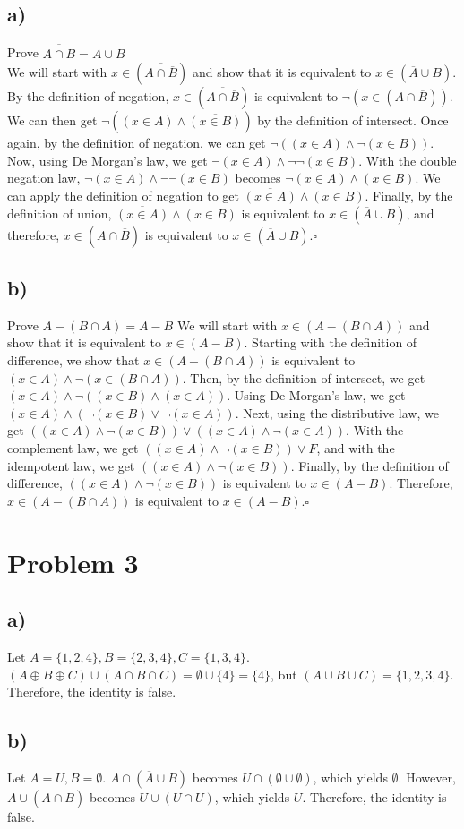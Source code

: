 \documentclass{article}
\begin{document}
\subsection*{a)}
Prove $\overline{A\cap \overline{B}}=\overline{A}\cup B$\\
We will start with $x\in(\overline{A\cap \overline{B}})$ and show that it is equivalent to $x\in(\overline{A}\cup B)$. By the definition of negation, $x\in(\overline{A\cap \overline{B}})$ is equivalent to $\neg(x\in(A\cap \overline{B}))$. We can then get $\neg((x\in A)\land \overline{(x\in B)})$ by the definition of intersect. Once again, by the definition of negation, we can get $\neg((x\in A)\land \neg(x\in B))$. Now, using De Morgan's law, we get $\neg(x\in A)\land \neg\neg(x\in B)$. With the double negation law, $\neg(x\in A)\land \neg\neg(x\in B)$ becomes $\neg(x\in A)\land (x\in B)$. We can apply the definition of negation to get $\overline{(x\in A)}\land (x\in B)$. Finally, by the definition of union, $\overline{(x\in A)}\land (x\in B)$ is equivalent to $x\in(\overline{A}\cup B)$, and therefore, $x\in(\overline{A\cap \overline{B}})$ is equivalent to $x\in(\overline{A}\cup B)$.\hfill $\square$
\subsection*{b)}
Prove $A-(B\cap A) = A - B$
We will start with $x\in (A-(B\cap A))$ and show that it is equivalent to $x\in (A-B)$. Starting with the definition of difference, we show that $x\in (A-(B\cap A))$ is equivalent to $(x\in A)\land \neg(x\in(B\cap A))$. Then, by the definition of intersect, we get $(x\in A)\land \neg((x\in B)\land (x\in A))$. Using De Morgan's law, we get $(x\in A)\land (\neg(x\in B)\lor \neg(x\in A))$. Next, using the distributive law, we get $((x\in A)\land\neg(x\in B))\lor ((x\in A)\land\neg(x\in A))$. With the complement law, we get $((x\in A)\land\neg(x\in B))\lor F$, and with the idempotent law, we get $((x\in A)\land\neg(x\in B))$. Finally, by the definition of difference, $((x\in A)\land\neg(x\in B))$ is equivalent to $x\in (A-B)$. Therefore, $x\in (A-(B\cap A))$ is equivalent to $x\in (A-B)$.\hfill$\square$
\section*{Problem 3}
\subsection*{a)}
Let $A=\{1,2,4\},B=\{2,3,4\},C=\{1,3,4\}$. $(A\oplus B\oplus C)\cup (A\cap B\cap C)=\emptyset\cup\{4\}=\{4\}$, but $(A\cup B\cup C)=\{1,2,3,4\}$. Therefore, the identity is false.
\subsection*{b)}
Let $A=U,B=\emptyset$. $A\cap (\overline{A}\cup B)$ becomes $U\cap (\emptyset\cup\emptyset)$, which yields $\emptyset$. However, $A\cup (A\cap\overline{B})$ becomes $U\cup(U\cap U)$, which yields $U$. Therefore, the identity is false.
\end{document}
